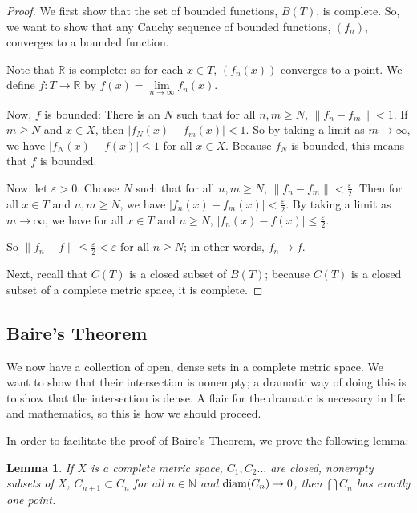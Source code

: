 \documentclass{amsart}
\newcommand{\vep}{\varepsilon}
\newcommand{\N}{\mathbb{N}}
\newcommand{\R}{\mathbb{R}}
\newcommand{\diam}{\text{\rm diam}}
\newcommand{\absval}[1]{\left| #1 \right|}
\newcommand{\norm}[1]{\|#1\|}
\newtheorem{lem}[thm]{Lemma}
\theoremstyle{definition}
\begin{document}
\begin{proof}
We first show that the set of bounded functions, $B(T)$, is complete.
So, we want to show that any Cauchy sequence of bounded functions, $(f_n)$, converges to a bounded function.

Note that $\R$ is complete: so for each $x \in T$, $(f_n(x))$ converges to a point. We define $f: T \to \R$ by $f(x) = \lim\limits_{n \to \infty} f_n(x)$.

Now, $f$ is bounded: 
There is an $N$ such that for all $n,m \geq N$, $\norm{f_n-f_m} < 1$.
If $m \geq N$ and $x \in X$, then $\absval{f_N(x) - f_m(x)} < 1$.
So by taking a limit as $m \to \infty$, we have $\absval{f_N(x) - f(x)} \leq 1$ for all $x \in X$.
Because $f_N$ is bounded, this means that $f$ is bounded.

Now: let $\vep >0$. Choose $N$ such that for all $n,m \geq N$, $\norm{f_n-f_m} < \frac{\vep}{2}$. 
Then for all $x \in T$ and $n,m \geq N$, we have $\absval{f_n(x) - f_m(x)} < \frac{\vep}{2}$.
By taking a limit as $m \to \infty$, we have for all $x \in T$ and $n \geq N$, $\absval{f_n(x) - f(x)} \leq \frac{\vep}{2}$.

So $\norm{f_n - f} \leq \frac{\vep}{2} < \vep$ for all $n \geq N$; in other words, $f_n \to f$.

Next, recall that $C(T)$ is a closed subset of $B(T)$; because $C(T)$ is a closed subset of a complete metric space, it is complete.

\end{proof}

\subsection{Baire's Theorem} \hspace*{\fill}

We now have a collection of open, dense sets in a complete metric space. 
We want to show that their intersection is nonempty; a dramatic way of doing this is to show that the intersection is dense. 
A flair for the dramatic is necessary in life and mathematics, so this is how we should proceed.

In order to facilitate the proof of Baire's Theorem, we prove the following lemma:

\begin{lem}
If $X$ is a complete metric space, $C_1, C_2 \ldots$ are closed, nonempty subsets of $X$, $C_{n+1} \subset C_n$ for all $n \in \N$ and $\diam(C_n) \to 0$, then $\bigcap C_n$ has exactly one point.
\end{lem}
\end{document}
